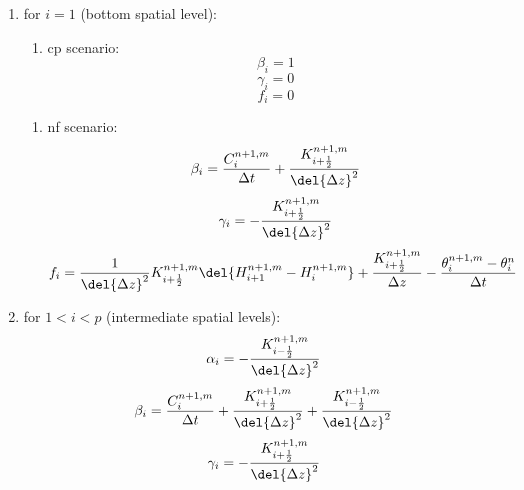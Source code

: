 \begin{enumerate}
\item for $i = 1$ (bottom spatial level):
  \begin{enumerate}
  \item cp scenario:
    \begin{equation}
    \label{eq:beta_bottom}
    \beta_i = 1
  \end{equation}
  \begin{equation}
    \label{eq:gamma_bottom}
    \gamma_i = 0
  \end{equation}
  \begin{equation}
    \label{eq:f_bottom}
    f_i = 0
  \end{equation}
\end{enumerate}
  \begin{enumerate}
  \item nf scenario:
    \begin{equation}
      \label{eq:beta_bottom}
      \beta_i = \frac{C_i^{n+1,m}}{\Delta t} + \frac{K_{i+\frac{1}{2}}^{n+1,m}}{\del{ \Delta z }^2}
  \end{equation}
  \begin{equation}
    \label{eq:gamma_bottom}
    \gamma_i = - \frac{K_{i+\frac{1}{2}}^{n+1,m}}{\del{ \Delta z }^2}
  \end{equation}
  \begin{equation}
    \label{eq:f_bottom}
    f_i = \frac{1}{\del{ \Delta z }^2} K_{i+\frac{1}{2}}^{n+1,m} \del{ H_{i+1}^{n+1,m} - H_{i}^{n+1,m}} + \frac{K_{i+\frac{1}{2}}^{n+1,m}}{\Delta z} - \frac{\theta_i^{n+1,m} - \theta_i^{n}}{\Delta t}
  \end{equation}
\end{enumerate}
\item for $1 < i < p$ (intermediate spatial levels):
  \begin{equation}
    \label{eq:alpha_intermediate}
    \alpha_i = - \frac{K_{i-\frac{1}{2}}^{n+1,m}}{\del{ \Delta z }^2}
  \end{equation}
  \begin{equation}
    \label{eq:beta_intermediate}
    \beta_i = \frac{C_i^{n+1,m}}{\Delta t} + \frac{K_{i+\frac{1}{2}}^{n+1,m}}{\del{ \Delta z }^2} + \frac{K_{i-\frac{1}{2}}^{n+1,m}}{\del{ \Delta z }^2}
  \end{equation}
  \begin{equation}
    \label{eq:gamma_intermediate}
    \gamma_i = - \frac{K_{i+\frac{1}{2}}^{n+1,m}}{\del{ \Delta z }^2}
  \end{equation}

\end{enumerate}
